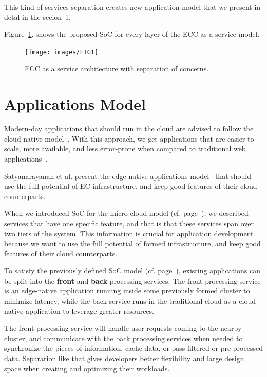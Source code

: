 \noindent
This kind of services separation creates new application model that we present in detal in the secion~\ref{sec:application_model}. 

Figure~\ref{fig:fig10}. shows the proposed SoC for every layer of the ECC as a service model.

\begin{figure}[H]
	\texttt{[image: images/FIG1]}
	\vspace{-0.7cm}
	\caption{ECC as a service architecture with separation of concerns.}
	\label{fig:fig10}
\end{figure}
%
%
\section{Applications Model}\label{sec:application_model}
%
Modern-day applications that should run in the cloud are advised to follow the cloud-native model~\cite{GannonBS17}. With this approach, we get applications that are easier to scale, more available, and less error-prone when compared to traditional web applications~\cite{GannonBS17}. 

Satyanarayanan et al. present the edge-native applications model~\cite{SatyanarayananK19} that should use the full potential of EC infrastructure, and keep good features of their cloud counterparts. 

When we introduced SoC for the micro-cloud model (cf. page~\pageref{services}), we described services that have one specific feature, and that is that these services span over two tiers of the system. This information is crucial for application development because we want to use the full potential of formed infrastructure, and keep good features of their cloud counterparts.

To satisfy the previously defined SoC model (cf. page~\pageref{services}), existing applications can be split into the \textbf{front} and \textbf{back} processing services. The front processing service is an edge-native application running inside some previously formed cluster to minimize latency, while the back service runs in the traditional cloud as a cloud-native application to leverage greater resources.

The front processing service will handle user requests coming to the nearby cluster, and communicate with the back processing services when needed to synchronize the pieces of information, cache data, or pass filtered or pre-processed data. Separation like that gives developers better flexibility and large design space when creating and optimizing their workloads.

